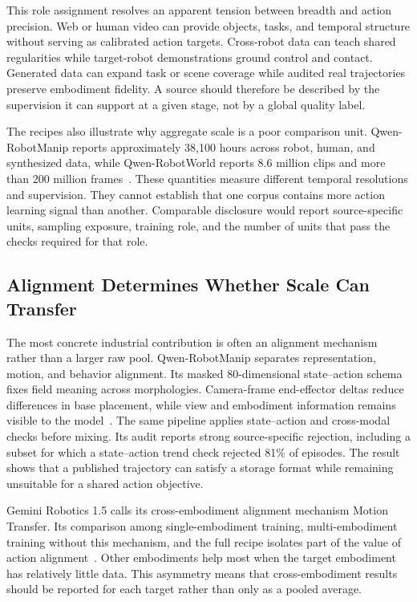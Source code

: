 This role assignment resolves an apparent tension between breadth and action precision. Web or human video can provide objects, tasks, and temporal structure without serving as calibrated action targets. Cross-robot data can teach shared regularities while target-robot demonstrations ground control and contact. Generated data can expand task or scene coverage while audited real trajectories preserve embodiment fidelity. A source should therefore be described by the supervision it can support at a given stage, not by a global quality label.

The recipes also illustrate why aggregate scale is a poor comparison unit. Qwen-RobotManip reports approximately 38,100 hours across robot, human, and synthesized data, while Qwen-RobotWorld reports 8.6 million clips and more than 200 million frames~\cite{yuan2026qwen_2606_17846,zhang2026qwen_2606_17030}. These quantities measure different temporal resolutions and supervision. They cannot establish that one corpus contains more action learning signal than another. Comparable disclosure would report source-specific units, sampling exposure, training role, and the number of units that pass the checks required for that role.

\subsection{Alignment Determines Whether Scale Can Transfer}

The most concrete industrial contribution is often an alignment mechanism rather than a larger raw pool. Qwen-RobotManip separates representation, motion, and behavior alignment. Its masked 80-dimensional state--action schema fixes field meaning across morphologies. Camera-frame end-effector deltas reduce differences in base placement, while view and embodiment information remains visible to the model~\cite{yuan2026qwen_2606_17846}. The same pipeline applies state--action and cross-modal checks before mixing. Its audit reports strong source-specific rejection, including a subset for which a state--action trend check rejected 81\% of episodes. The result shows that a published trajectory can satisfy a storage format while remaining unsuitable for a shared action objective.

Gemini Robotics 1.5 calls its cross-embodiment alignment mechanism Motion Transfer. Its comparison among single-embodiment training, multi-embodiment training without this mechanism, and the full recipe isolates part of the value of action alignment~\cite{team2025gemini_2510_03342}. Other embodiments help most when the target embodiment has relatively little data. This asymmetry means that cross-embodiment results should be reported for each target rather than only as a pooled average.

